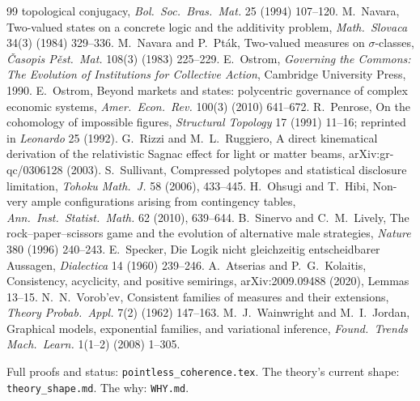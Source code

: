 \documentclass[11pt]{article}
\begin{document}
\begin{thebibliography}{99}
  topological conjugacy, \emph{Bol.\ Soc.\ Bras.\ Mat.} 25 (1994) 107--120.
 M.~Navara, Two-valued states on a concrete logic and the
  additivity problem, \emph{Math.\ Slovaca} 34(3) (1984) 329--336.
 M.~Navara and P.~Pt\'ak, Two-valued measures on
  $\sigma$-classes, \emph{\v{C}asopis P\v{e}st.\ Mat.} 108(3) (1983) 225--229.
 E.~Ostrom, \emph{Governing the Commons: The Evolution of
  Institutions for Collective Action}, Cambridge University Press, 1990.
 E.~Ostrom, Beyond markets and states: polycentric
  governance of complex economic systems, \emph{Amer.\ Econ.\ Rev.} 100(3)
  (2010) 641--672.
 R.~Penrose, On the cohomology of impossible figures,
  \emph{Structural Topology} 17 (1991) 11--16; reprinted in \emph{Leonardo} 25
  (1992).
 G.~Rizzi and M.~L.~Ruggiero, A direct kinematical
derivation of the relativistic Sagnac effect for light or matter beams,
arXiv:gr-qc/0306128 (2003).
 S.~Sullivant, Compressed polytopes and statistical disclosure
limitation, \emph{Tohoku Math.\ J.} 58 (2006), 433--445.
 H.~Ohsugi and T.~Hibi, Non-very ample configurations arising
from contingency tables, \emph{Ann.\ Inst.\ Statist.\ Math.} 62 (2010), 639--644.
 B.~Sinervo and C.~M.~Lively, The rock--paper--scissors
  game and the evolution of alternative male strategies, \emph{Nature} 380
  (1996) 240--243.
 E.~Specker, Die Logik nicht gleichzeitig entscheidbarer
  Aussagen, \emph{Dialectica} 14 (1960) 239--246.
 A.~Atserias and P.~G.~Kolaitis, Consistency, acyclicity, and
  positive semirings, arXiv:2009.09488 (2020), Lemmas 13--15.
 N.~N.~Vorob'ev, Consistent families of measures and their
  extensions, \emph{Theory Probab.\ Appl.} 7(2) (1962) 147--163.
 M.~J.~Wainwright and M.~I.~Jordan, Graphical
  models, exponential families, and variational inference, \emph{Found.\
  Trends Mach.\ Learn.} 1(1--2) (2008) 1--305.
\end{thebibliography}

\medskip\noindent\small Full proofs and status: \texttt{pointless\_coherence.tex}.
The theory's current shape: \texttt{theory\_shape.md}. The why: \texttt{WHY.md}.
\end{document}
